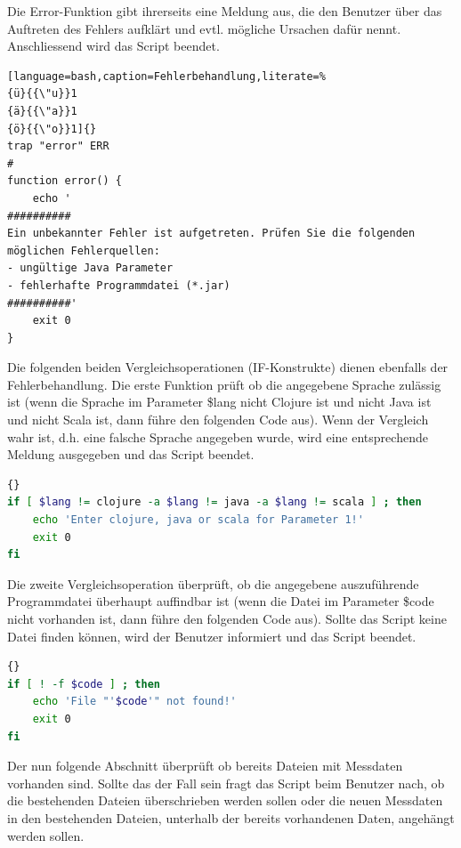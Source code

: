 \documentclass{fancydocument}
\begin{document}
Die Error-Funktion gibt ihrerseits eine Meldung aus, die den Benutzer über das Auftreten des Fehlers aufklärt und evtl. mögliche Ursachen dafür nennt. Anschliessend wird das Script beendet.

\begin{minipage}{\textwidth}
\begin{lstlisting}[language=bash,caption=Fehlerbehandlung,literate=% 
{ü}{{\"u}}1 
{ä}{{\"a}}1 
{ö}{{\"o}}1]{}
trap "error" ERR
#
function error() {
	echo '
##########
Ein unbekannter Fehler ist aufgetreten. Prüfen Sie die folgenden möglichen Fehlerquellen:
- ungültige Java Parameter
- fehlerhafte Programmdatei (*.jar)
##########'
	exit 0
}
\end{lstlisting}
\end{minipage}

Die folgenden beiden Vergleichsoperationen (IF-Konstrukte) dienen ebenfalls der Fehlerbehandlung. Die erste Funktion prüft ob die angegebene Sprache zulässig ist (wenn die Sprache im Parameter \$lang nicht Clojure ist und nicht Java ist und nicht Scala ist, dann führe den folgenden Code aus). Wenn der Vergleich wahr ist, d.h. eine falsche Sprache angegeben wurde, wird eine entsprechende Meldung ausgegeben und das Script beendet.

\begin{minipage}{\textwidth}
\begin{lstlisting}[language=bash,caption=Sprachparameter prüfen]{}
if [ $lang != clojure -a $lang != java -a $lang != scala ] ; then
	echo 'Enter clojure, java or scala for Parameter 1!'
	exit 0
fi
\end{lstlisting}
\end{minipage}

Die zweite Vergleichsoperation überprüft, ob die angegebene auszuführende Programmdatei überhaupt auffindbar ist (wenn die Datei im Parameter \$code nicht vorhanden ist, dann führe den folgenden Code aus). Sollte das Script keine Datei finden können, wird der Benutzer informiert und das Script beendet.

\begin{minipage}{\textwidth}
\begin{lstlisting}[language=bash,caption=Jar-Datei prüfen]{}
if [ ! -f $code ] ; then
	echo 'File "'$code'" not found!'
	exit 0
fi
\end{lstlisting}
\end{minipage}

Der nun folgende Abschnitt überprüft ob bereits Dateien mit Messdaten vorhanden sind. Sollte das der Fall sein fragt das Script beim Benutzer nach, ob die bestehenden Dateien überschrieben werden sollen oder die neuen Messdaten in den bestehenden Dateien, unterhalb der bereits vorhandenen Daten, angehängt werden sollen.
\end{document}
